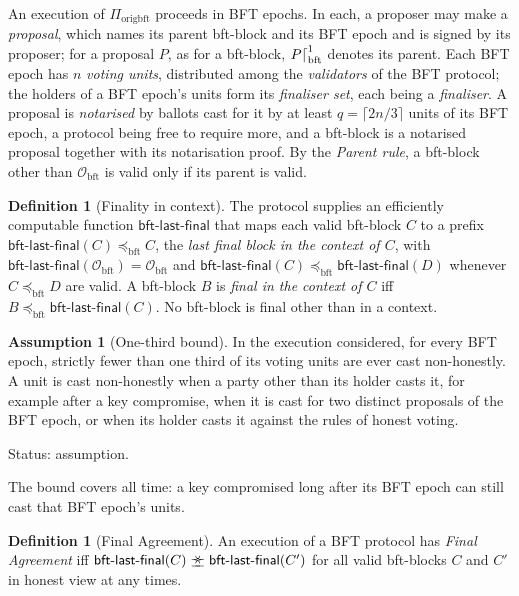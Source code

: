 \documentclass[11pt,a4paper]{article}
\theoremstyle{definition}
\newtheorem{definition}[theorem]{Definition}
\newtheorem{assumption}[theorem]{Assumption}
\newcommand{\bft}{\mathrm{bft}}
\newcommand{\Origin}{\mathcal{O}}
\newcommand{\Obft}{\Origin_{\bft}}
\newcommand{\preceqbft}{\preceq_{\bft}}
\newcommand{\agrees}{\mathrel{\preceq\mkern-9mu\succeq}}
\newcommand{\Piorigbft}{\Pi_{\mathrm{origbft}}}
\newcommand{\bftlastfinal}{\mathsf{bft\text{-}last\text{-}final}}
\begin{document}
An execution of $\Piorigbft$ proceeds in BFT epochs. In each, a proposer may
make a \emph{proposal}, which names its parent bft-block and its BFT epoch
and is signed by its proposer; for a proposal $P$, as for a bft-block,
$P\trunc[\bft]{1}$ denotes its parent. Each BFT epoch has $n$ \emph{voting
units},
distributed among the \emph{validators} of the BFT protocol; the holders of
a BFT epoch's units form its \emph{finaliser set}, each being a
\emph{finaliser}. A proposal is \emph{notarised} by ballots cast for it by
at least $q = \lceil 2n/3 \rceil$ units of its BFT epoch, a protocol being
free to require more, and a bft-block is a notarised proposal together with
its notarisation proof. By the \emph{Parent rule}, a bft-block other than
$\Obft$ is valid only if its parent is valid.

\begin{definition}[Finality in context]\label{def:blf}
The protocol supplies an efficiently computable function $\bftlastfinal$
that maps each valid bft-block $C$ to a prefix $\bftlastfinal(C)
\preceqbft C$, the \emph{last final block in the context of $C$}, with
$\bftlastfinal(\Obft) = \Obft$ and $\bftlastfinal(C) \preceqbft
\bftlastfinal(D)$ whenever $C \preceqbft D$ are valid. A bft-block $B$ is
\emph{final in the context of $C$} iff $B \preceqbft \bftlastfinal(C)$. No
bft-block is final other than in a context.
\end{definition}

\begin{assumption}[One-third bound]\label{ass:one-third}
In the execution considered, for every BFT epoch, strictly fewer than one
third of its voting units are ever cast non-honestly. A unit is cast
non-honestly when a party other than its holder casts it, for example after
a key compromise, when it is cast for two distinct proposals of the BFT
epoch, or when its holder casts it against the rules of honest voting.

Status: assumption.
\end{assumption}

The bound covers all time: a key compromised long after its BFT epoch can
still cast that BFT epoch's units.

\begin{definition}[Final Agreement]\label{def:fa}
An execution of a BFT protocol has \emph{Final Agreement} iff
$\bftlastfinal(C) \agrees \bftlastfinal(C')$ for all valid bft-blocks $C$
and $C'$ in honest view at any times.
\end{definition}
\end{document}

